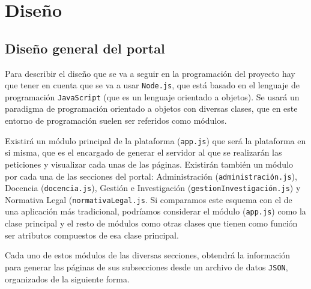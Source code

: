 \chapter{Diseño}

\section{Diseño general del portal}

Para describir el diseño que se va a seguir en la programación del proyecto hay que tener en cuenta que se va a usar 
{\tt Node.js}, que está basado en el lenguaje de programación {\tt JavaScript} (que es un lenguaje orientado a objetos). Se 
usará un paradigma de programación orientado a objetos con diversas clases, que en este entorno de programación suelen ser 
referidos como módulos.

\bigskip
Existirá un módulo principal de la plataforma ({\tt app.js}) que será la plataforma en si misma, que es el encargado
de generar el servidor al que se realizarán las peticiones y visualizar cada unas de las páginas. Existirán también un módulo
por cada una de las secciones del portal: Administración ({\tt administración.js}), Docencia ({\tt docencia.js}), Gestión
e Investigación ({\tt gestionInvestigación.js}) y Normativa Legal ({\tt normativaLegal.js}. Si comparamos este esquema
con el de una aplicación más tradicional, podríamos considerar el módulo ({\tt app.js}) como la clase principal y el resto
de módulos como otras clases que tienen como función ser atributos compuestos de esa clase principal.

\bigskip
Cada uno de estos módulos de las diversas secciones, obtendrá la información para generar las páginas de sus subsecciones 
desde un archivo de datos {\tt JSON}, organizados de la siguiente forma.

